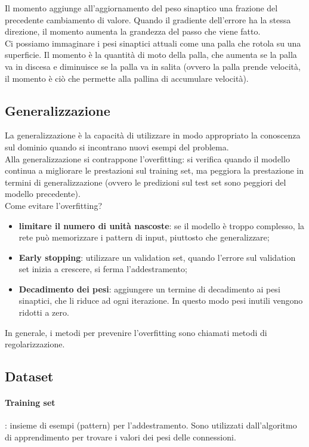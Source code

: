 Il momento aggiunge all'aggiornamento del peso sinaptico una frazione del
precedente cambiamento di valore. Quando il gradiente dell'errore ha la stessa
direzione, il momento aumenta la grandezza del passo che viene fatto.\\
Ci possiamo immaginare i pesi sinaptici attuali come una palla che rotola su una
superficie. Il momento è la quantità di moto della palla, che aumenta se la
palla va in discesa e diminuisce se la palla va in salita (ovvero la palla
prende velocità, il momento è ciò che permette alla pallina di accumulare
velocità).

\subsection{Generalizzazione}

La generalizzazione è la capacità di utilizzare in modo appropriato la
conoscenza sul dominio quando si incontrano nuovi esempi del problema.\\
Alla generalizzazione si contrappone l'overfitting: si verifica quando il
modello continua a migliorare le prestazioni sul training set, ma peggiora la
prestazione in termini di generalizzazione (ovvero le predizioni sul test set
sono peggiori del modello precedente).\\
Come evitare l'overfitting?
\begin{itemize}
	\item \textbf{limitare il numero di unità nascoste}: se il modello è troppo 
		complesso, la rete può memorizzare i pattern di input, piuttosto che 
		generalizzare;

	\item \textbf{Early stopping}: utilizzare un validation set, quando l'errore
		sul validation set inizia a crescere, si ferma l'addestramento;

	\item \textbf{Decadimento dei pesi}: aggiungere un termine di decadimento
		ai pesi sinaptici, che li riduce ad ogni iterazione. In questo modo pesi
		inutili vengono ridotti a zero.
\end{itemize}

In generale, i metodi per prevenire l'overfitting sono chiamati metodi
di regolarizzazione.

\subsection{Dataset}

\paragraph{Training set}: insieme di esempi (pattern) per l'addestramento. Sono
utilizzati dall'algoritmo di apprendimento per trovare i valori dei pesi delle
connessioni.

